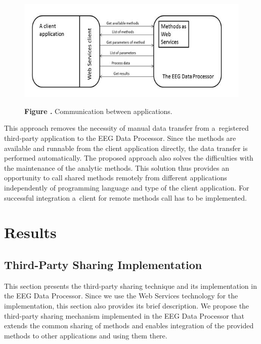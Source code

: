 \documentclass{frontiersSCNS} %
\begin{document}
\begin{figure}
\begin{center}
\includegraphics[width=18cm]{methods}%
\end{center}
\textbf{\label{fig:01} Figure .}{ Communication between applications. }
\end{figure}

This approach removes the necessity of manual data transfer from a~registered third-party application to the EEG Data Processor. Since the methods are available and runnable from the client application directly, the data transfer is performed automatically. The proposed approach also solves the difficulties with the maintenance of the analytic methods. This solution thus provides an opportunity to call shared methods remotely from different applications independently of programming language and type of the client application. For successful integration a~client for remote methods call has to be implemented.

\section{Results}

\subsection{Third-Party Sharing Implementation}

This section presents the third-party sharing technique and its implementation in the EEG Data Processor. Since we use the Web Services technology for the implementation, this section also provides its brief description. We propose the third-party sharing mechanism implemented in the EEG Data Processor that extends the common sharing of methods and enables integration of the provided methods to other applications and using them there.
\end{document}
